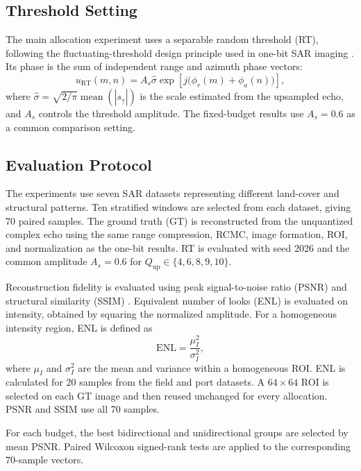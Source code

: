 \documentclass[conference]{IEEEtran}
\begin{document}
\subsection{Threshold Setting}

The main allocation experiment uses a separable random threshold (RT), following the fluctuating-threshold design principle used in one-bit SAR imaging \cite{nie2025fixed}. Its phase is the sum of independent range and azimuth phase vectors:
\begin{equation}
    u_{\mathrm{RT}}(m,n)
    =A_s\hat{\sigma}\exp\!\left[j\bigl(\phi_r(m)+\phi_a(n)\bigr)\right],
\end{equation}
where $\hat{\sigma}=\sqrt{2/\pi}\operatorname{mean}(|s_{\uparrow}|)$ is the scale estimated from the upsampled echo, and $A_s$ controls the threshold amplitude. The fixed-budget results use $A_s=0.6$ as a common comparison setting.

\subsection{Evaluation Protocol}

The experiments use seven SAR datasets representing different land-cover and structural patterns. Ten stratified windows are selected from each dataset, giving 70 paired samples. The ground truth (GT) is reconstructed from the unquantized complex echo using the same range compression, RCMC, image formation, ROI, and normalization as the one-bit results. RT is evaluated with seed 2026 and the common amplitude $A_s=0.6$ for $Q_{\mathrm{up}}\in\{4,6,8,9,10\}$.

Reconstruction fidelity is evaluated using peak signal-to-noise ratio (PSNR) and structural similarity (SSIM) \cite{wang2004ssim}. Equivalent number of looks (ENL) is evaluated on intensity, obtained by squaring the normalized amplitude. For a homogeneous intensity region, ENL is defined as \cite{feng2015tgv}
\begin{equation}
    \mathrm{ENL}=\frac{\mu_I^2}{\sigma_I^2},
\end{equation}
where $\mu_I$ and $\sigma_I^2$ are the mean and variance within a homogeneous ROI. ENL is calculated for 20 samples from the field and port datasets. A $64\times64$ ROI is selected on each GT image and then reused unchanged for every allocation. PSNR and SSIM use all 70 samples.

For each budget, the best bidirectional and unidirectional groups are selected by mean PSNR. Paired Wilcoxon signed-rank tests \cite{wilcoxon1945ranking} are applied to the corresponding 70-sample vectors.
\end{document}
